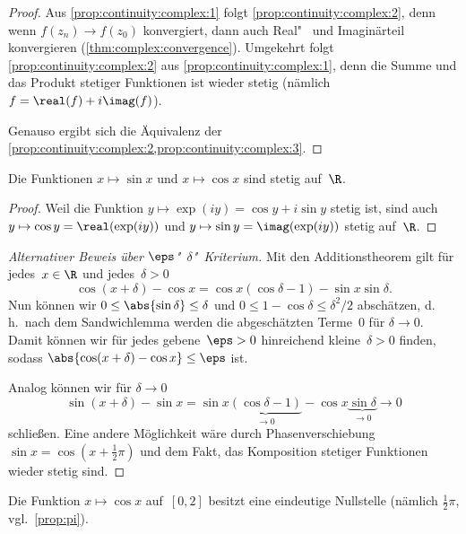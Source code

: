 \documentclass[a4paper]{article}
\begin{document}
\begin{proof}
    Aus \cref{prop:continuity:complex:1} folgt \cref{prop:continuity:complex:2}, denn wenn $f(z_n) \to f(z_0)$ konvergiert, dann auch Real"~ und Imaginärteil konvergieren (\cref{thm:complex:convergence}). Umgekehrt folgt \cref{prop:continuity:complex:2} aus \cref{prop:continuity:complex:1}, denn die Summe und das Produkt stetiger Funktionen ist wieder stetig (nämlich $f = \real(f) + i\imag(f)$).

    Genauso ergibt sich die Äquivalenz der \cref{prop:continuity:complex:2,prop:continuity:complex:3}.
\end{proof}

\begin{corollary}\label{cor:continuity:sincos}
    Die Funktionen $x \mapsto \sin x$ und $x \mapsto \cos x$ sind stetig auf~$\R$.
\end{corollary}

\begin{proof}
    Weil die Funktion $y \mapsto \exp(iy) = \cos y + i\sin y$ stetig ist, sind auch $y \mapsto \cos y = \real(\exp(iy))$ und $y \mapsto \sin y = \imag(\exp(iy))$ stetig auf~$\R$.
\end{proof}

\begin{proof}[Alternativer Beweis über $\eps$"~$\delta$"~Kriterium]
    Mit den Additionstheorem gilt für jedes~$x \in \R$ und jedes~$\delta > 0$
    \begin{equation*}
        \cos(x+\delta) - \cos x = \cos x(\cos\delta-1) - \sin x\sin \delta.
    \end{equation*}
    Nun können wir $0 \leq \abs{\sin\delta} \leq \delta$ und $0 \leq 1-\cos\delta \leq \delta^2/2$ abschätzen, d.\,h.\ nach dem Sandwichlemma werden die abgeschätzten Terme~$0$ für $\delta \to 0$. Damit können wir für jedes gebene~$\eps > 0$ hinreichend kleine~$\delta > 0$ finden, sodass $\abs{\cos(x+\delta)-\cos x} \leq \eps$ ist.

    Analog können wir für $\delta \to 0$
    \begin{equation*}
        \sin(x+\delta) - \sin x = \sin x\underbrace{(\cos\delta-1)}_{\to 0} - \cos x\underbrace{\sin\delta}_{\to 0} \to 0
    \end{equation*}
    schließen. Eine andere Möglichkeit wäre durch Phasenverschiebung $\sin x = \cos(x+\frac{1}{2}\pi)$ und dem Fakt, das Komposition stetiger Funktionen wieder stetig sind.
\end{proof}

\begin{corollary}\label{cor:coszero}\leavevmode
    Die Funktion $x \mapsto \cos x$ auf~$[0, 2]$ besitzt eine eindeutige Nullstelle (nämlich $\frac{1}{2}\pi$, vgl.\ \cref{prop:pi}).
\end{corollary}
\end{document}
